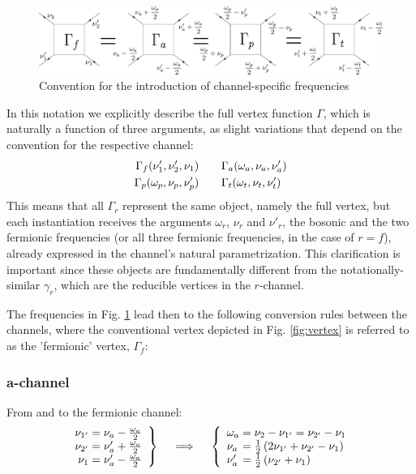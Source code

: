 \documentclass[12pt,a4paper,roman]{article}
\begin{document}
\begin{figure}[ht]
    \centering
    \includegraphics[width=\linewidth]{figures/channels_with_labels.pdf}
    \caption{Convention for the introduction of channel-specific frequencies}
    \label{fig:channels}
\end{figure}
In this notation we explicitly describe the full vertex function $\Gamma$, which is naturally a function of three arguments, as slight variations that depend on the convention for the respective channel:
\begin{align}
 \Gamma_f(\nu_1', \nu_2', \nu_1) &\hspace{0.7cm} \Gamma_a(\omega_a, \nu_a, \nu_a') \label{eq:vertexParam1}\\
 \Gamma_p(\omega_p, \nu_p, \nu_p') &\hspace{0.7cm} \Gamma_t(\omega_t, \nu_t, \nu_t')
 \label{eq:vertexParam2}
\end{align} 
This means that all $\Gamma_r$ represent the same object, namely the full vertex, but each instantiation receives the arguments $\omega_r$, $\nu_r$ and $\nu'_r$, the bosonic and the two fermionic frequencies (or all three fermionic frequencies, in the case of $r=f$), already expressed in the channel's natural parametrization. This clarification is important since these objects are fundamentally different from the notationally-similar $\gamma_r$, which are the reducible vertices in the $r$-channel.

The frequencies in Fig. \ref{fig:channels} lead then to the following conversion rules between the channels, where the conventional vertex depicted in Fig. \ref{fig:vertex} is referred to as the 'fermionic' vertex, $\Gamma_f$:

\subsubsection*{a-channel}
From and to the fermionic channel:
\begin{align}
    \left.\begin{array}{r@{\mskip\thickmuskip}l}
    \nu_{1'} &= \nu_a - \frac{\omega_a}{2} \\
    \nu_{2'} &= \nu'_a + \frac{\omega_a}{2} \\
    \nu_{1 } &= \nu'_a - \frac{\omega_a}{2} \\
  \end{array} \right\}
  \quad \implies \quad
  \left\{\begin{array}{l@{\mskip\thickmuskip}l}
    \omega_a &= \nu_{2} - \nu_{1'} = \nu_{2'} - \nu_{1}\\
    \nu_a    &= \frac{1}{2}\left(2\nu_{1'}+\nu_{2'}-\nu_{1}\right) \\
    \nu'_a   &= \frac{1}{2}\left(\nu_{2'} + \nu_{1}\right)\\
  \end{array}\right.
  \label{eq:AtoF}
\end{align}
\end{document}
